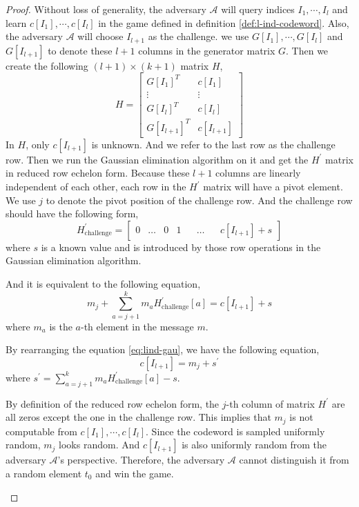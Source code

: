 \begin{proof}
Without loss of generality, the adversary $\mathcal{A}$ will query indices $I_1, \cdots, I_l$ and learn $c[I_1], \cdots, c[I_l]$ in the game defined in definition \ref{def:l-ind-codeword}. Also, the adversary $\mathcal{A}$ will choose $I_{l+1}$ as the challenge. we use $G[I_1], \cdots, G[I_l]$ and $G[I_{l+1}]$ to denote these $l+1$ columns in the generator matrix $G$. Then we create the following $(l+1)\times(k+1)$ matrix $H$,
$$
H = 
\begin{bmatrix}
    G[I_1]^T & c[I_1] \\
    \vdots & \vdots \\
    G[I_{l}]^T & c[I_{l}] \\
    G[I_{l+1}]^T & c[I_{l+1}]
\end{bmatrix}  
$$
In $H$, only $c[I_{l+1}]$ is unknown. And we refer to the last row as the challenge row. Then we run the Gaussian elimination algorithm on it and get the $H^\prime$ matrix in reduced row echelon form. Because these $l+1$ columns are linearly independent of each other, each row in the $H^\prime$ matrix will have a pivot element. We use $j$ to denote the pivot position of the challenge row. And the challenge row should have the following form,
$$
H^\prime_{\text{challenge}} = 
\begin{bmatrix}
    0 & \dots & 0 & 1 &  & \dots &  & c[I_{l+1}] + s
\end{bmatrix}  
$$
where $s$ is a known value and is introduced by those row operations in the Gaussian elimination algorithm.

And it is equivalent to the following equation,
\begin{equation}
\label{eq:lind-gau}
    m_j + \sum_{a=j+1}^{k} m_a H^\prime_{\text{challenge}}[a] = c[I_{l+1}] + s
\end{equation}
where $m_a$ is the $a$-th element in the message $m$.

By rearranging the equation \ref{eq:lind-gau}, we have the following equation,
\begin{equation}
    c[I_{l+1}] = m_j + s^\prime
\end{equation}
where $s^\prime = \sum_{a=j+1}^{k} m_a H^\prime_{\text{challenge}}[a] - s$. 

By definition of the reduced row echelon form, the $j$-th column of matrix $H^\prime$ are all zeros except the one in the challenge row. This implies that $m_j$ is not computable from $c[I_1], \cdots, c[I_l]$. Since the codeword is sampled uniformly random, $m_j$ looks random. And $c[I_{l+1}]$ is also uniformly random from the adversary $\mathcal{A}$'s perspective. Therefore, the adversary $\mathcal{A}$ cannot distinguish it from a random element $t_0$ and win the game. 

\qedsymbol{}
$ $
\end{proof}

